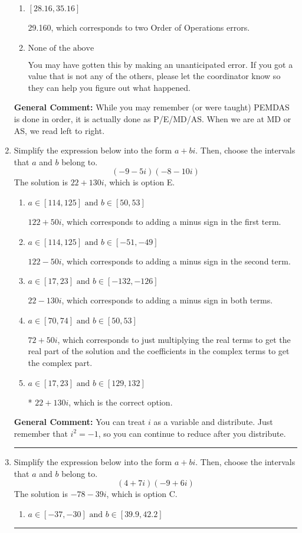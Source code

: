 \documentclass{extbook}[14pt]
\newcommand{\litem}[1]{\item #1

\rule{\textwidth}{0.4pt}}
\begin{document}
\begin{enumerate}
{\begin{enumerate}[label=\Alph*.]
* 27.000, this is the correct option
\item \( [28.16, 35.16] \)

 29.160, which corresponds to two Order of Operations errors.
\item \( \text{None of the above} \)

 You may have gotten this by making an unanticipated error. If you got a value that is not any of the others, please let the coordinator know so they can help you figure out what happened.
\end{enumerate}

\textbf{General Comment:} While you may remember (or were taught) PEMDAS is done in order, it is actually done as P/E/MD/AS. When we are at MD or AS, we read left to right.
}
\litem{
Simplify the expression below into the form $a+bi$. Then, choose the intervals that $a$ and $b$ belong to.
\[ (-9 - 5 i)(-8 - 10 i) \]The solution is \( 22 + 130 i \), which is option E.\begin{enumerate}[label=\Alph*.]
\item \( a \in [114, 125] \text{ and } b \in [50, 53] \)

 $122 + 50 i$, which corresponds to adding a minus sign in the first term.
\item \( a \in [114, 125] \text{ and } b \in [-51, -49] \)

 $122 - 50 i$, which corresponds to adding a minus sign in the second term.
\item \( a \in [17, 23] \text{ and } b \in [-132, -126] \)

 $22 - 130 i$, which corresponds to adding a minus sign in both terms.
\item \( a \in [70, 74] \text{ and } b \in [50, 53] \)

 $72 + 50 i$, which corresponds to just multiplying the real terms to get the real part of the solution and the coefficients in the complex terms to get the complex part.
\item \( a \in [17, 23] \text{ and } b \in [129, 132] \)

* $22 + 130 i$, which is the correct option.
\end{enumerate}

\textbf{General Comment:} You can treat $i$ as a variable and distribute. Just remember that $i^2=-1$, so you can continue to reduce after you distribute.
}
\litem{
Simplify the expression below into the form $a+bi$. Then, choose the intervals that $a$ and $b$ belong to.
\[ (4 + 7 i)(-9 + 6 i) \]The solution is \( -78 - 39 i \), which is option C.\begin{enumerate}[label=\Alph*.]
\item \( a \in [-37, -30] \text{ and } b \in [39.9, 42.2] \)


\end{enumerate}}
\end{enumerate}
\end{document}
